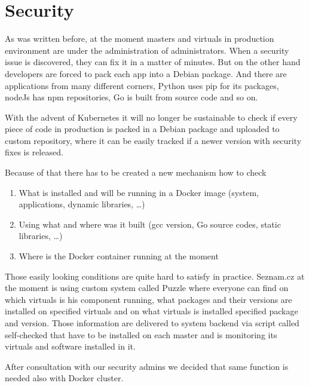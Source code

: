 \chapter{Security}

As was written before, at the moment masters and virtuals in production environment are under the administration of administrators. When a security issue is discovered, they can fix it in a matter of minutes. But on the other hand developers are forced to pack each app into a Debian package. And there are applications from many different corners, Python uses pip \cite{pip} for its packages, nodeJs \cite{nodejs} has npm \cite{npm} repositories, Go is built from source code and so on.

With the advent of Kubernetes it will no longer be sustainable to check if every piece of code in production is packed in a Debian package and uploaded to custom repository, where it can be easily tracked if a newer version with security fixes is released.

Because of that there has to be created a new mechanism how to check
\begin{enumerate}
  \item What is installed and will be running in a Docker image (system, applications, dynamic libraries, \ldots)
  \item Using what and where was it built (gcc version, Go source codes, static libraries, \ldots)
  \item Where is the Docker container running at the moment
\end{enumerate}

Those easily looking conditions are quite hard to satisfy in practice. Seznam.cz at the moment is using custom system called Puzzle where everyone can find on which virtuals is his component running, what packages and their versions are installed on specified virtuals and on what virtuals is installed specified package and version. Those information are delivered to system backend via script called self-checked that have to be installed on each master and is monitoring its virtuals and software installed in it.

After consultation with our security admins we decided that same function is needed also with Docker cluster.

